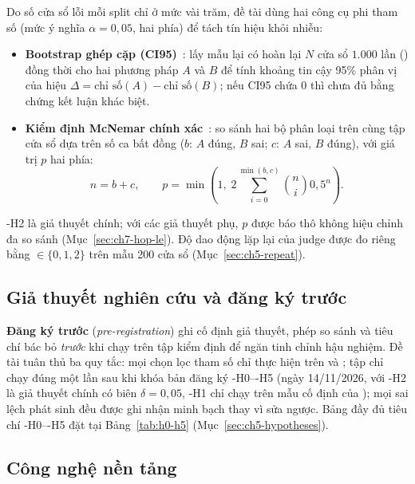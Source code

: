 Do số cửa sổ lỗi mỗi split chỉ ở mức vài trăm, đề tài dùng hai công cụ phi tham số (mức ý nghĩa $\alpha = 0{,}05$, hai phía) để tách tín hiệu khỏi nhiễu:
\begin{itemize}[label=--]
  \item \textbf{Bootstrap ghép cặp (CI95)}~\cite{efron1993bootstrap}: lấy mẫu lại có hoàn lại $N$ cửa sổ $1.000$ lần () đồng thời cho hai phương pháp $A$ và $B$ để tính khoảng tin cậy 95\% phân vị của hiệu $\Delta = \text{chỉ số}(A) - \text{chỉ số}(B)$; nếu CI95 chứa $0$ thì chưa đủ bằng chứng kết luận khác biệt.
  \item \textbf{Kiểm định McNemar chính xác}~\cite{mcnemar1947note}: so sánh hai bộ phân loại trên cùng tập cửa sổ dựa trên số ca bất đồng ($b$: $A$ đúng, $B$ sai; $c$: $A$ sai, $B$ đúng), với giá trị $p$ hai phía:
  \begin{equation}
    n = b + c, \qquad
    p = \min\!\left(1,\; 2 \sum_{i=0}^{\min(b, c)} \binom{n}{i} 0{,}5^n\right).
    \label{eq:ch2-mcnemar}
  \end{equation}
\end{itemize}
\hyp{H2} là giả thuyết chính; với các giả thuyết phụ, $p$ được báo thô không hiệu chỉnh đa so sánh (Mục~\ref{sec:ch7-hop-le}). Độ dao động lặp lại của judge được đo riêng bằng  $\in \{0, 1, 2\}$ trên mẫu 200 cửa sổ (Mục~\ref{sec:ch5-repeat}).

\subsection{Giả thuyết nghiên cứu và đăng ký trước}
\label{sec:ch2-dang-ky}

\textbf{Đăng ký trước} (\emph{pre-registration}) ghi cố định giả thuyết, phép so sánh và tiêu chí bác bỏ \emph{trước} khi chạy trên tập kiểm định để ngăn tinh chỉnh hậu nghiệm. Đề tài tuân thủ ba quy tắc: mọi chọn lọc tham số chỉ thực hiện trên  và ; tập  chỉ chạy đúng một lần sau khi khóa bản đăng ký \hyp{H0}--\hyp{H5} (ngày 14/11/2026, với \hyp{H2} là giả thuyết chính có biên $\delta = 0{,}05$, \hyp{H1} chỉ chạy trên mẫu cố định của ); mọi sai lệch phát sinh đều được ghi nhận minh bạch thay vì sửa ngược. Bảng đầy đủ tiêu chí \hyp{H0}--\hyp{H5} đặt tại Bảng~\ref{tab:h0-h5} (Mục~\ref{sec:ch5-hypotheses}).

\subsection{Công nghệ nền tảng}
\label{sec:ch2-cong-nghe}

